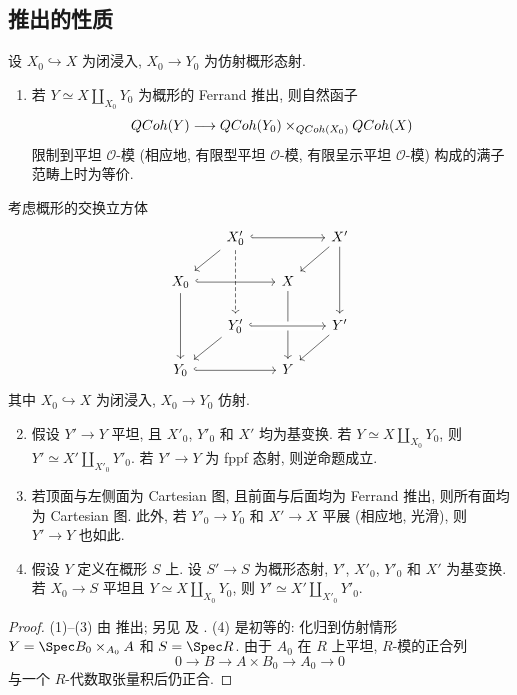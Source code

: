 \subsection{推出的性质}\label{src:B.4.2-subsection}
\begin{proposition}[推出的性质]\label{src:B.4.8}
设 $X_0\hookrightarrow X$ 为闭浸入, $X_0\to Y_0$ 为仿射概形态射.
\begin{enumerate}[(1)]
\item 若 $Y\simeq X\amalg_{X_0}Y_0$ 为概形的 Ferrand 推出, 则自然函子
\[
QCoh(Y)\longrightarrow QCoh(Y_0)\times_{QCoh(X_0)}QCoh(X)
\]
限制到平坦 $\mathcal O$-模 (相应地, 有限型平坦 $\mathcal O$-模, 有限呈示平坦 $\mathcal O$-模) 构成的满子范畴上时为等价.
\end{enumerate}
考虑概形的交换立方体
\[
\begin{tikzcd}[column sep=1.8em,row sep=1.5em]
&X'_0\arrow[rr,hook]\arrow[dl]\arrow[dd,dashed]&&X'\arrow[dl]\arrow[dd]\\
X_0\arrow[rr,hook]\arrow[dd]&&X\arrow[dd]&\\
&Y'_0\arrow[rr,hook,crossing over]\arrow[dl]&&Y'\arrow[dl]\\
Y_0\arrow[rr,hook]&&Y&
\end{tikzcd}
\]
其中 $X_0\hookrightarrow X$ 为闭浸入, $X_0\to Y_0$ 仿射.
\begin{enumerate}[(1)]
\setcounter{enumi}{1}
\item 假设 $Y'\to Y$ 平坦, 且 $X'_0$, $Y'_0$ 和 $X'$ 均为基变换. 若 $Y\simeq X\amalg_{X_0}Y_0$, 则 $Y'\simeq X'\amalg_{X'_0}Y'_0$. 若 $Y'\to Y$ 为 fppf 态射, 则逆命题成立.
\item 若顶面与左侧面为 Cartesian 图, 且前面与后面均为 Ferrand 推出, 则所有面均为 Cartesian 图. 此外, 若 $Y'_0\to Y_0$ 和 $X'\to X$ 平展 (相应地, 光滑), 则 $Y'\to Y$ 也如此.
\item 假设 $Y$ 定义在概形 $S$ 上. 设 $S'\to S$ 为概形态射, $Y'$, $X'_0$, $Y'_0$ 和 $X'$ 为基变换. 若 $X_0\to S$ 平坦且 $Y\simeq X\amalg_{X_0}Y_0$, 则 $Y'\simeq X'\amalg_{X'_0}Y'_0$.
\end{enumerate}
\end{proposition}
\begin{proof}
(1)--(3) 由 \cite[定理 $2.2$]{Fer03} 推出; 另见 \cite[Tag 0D2K]{SP} 及 \cite[\S$4$]{AHHLR24}. (4) 是初等的: 化归到仿射情形 $Y=\Spec B_0\times_{A_0}A$ 和 $S=\Spec R$. 由于 $A_0$ 在 $R$ 上平坦, $R$-模的正合列
\[
0\longrightarrow B\longrightarrow A\times B_0\longrightarrow A_0\longrightarrow0
\]
与一个 $R$-代数取张量积后仍正合.
\end{proof}
\par\clearpage
\endgroup
